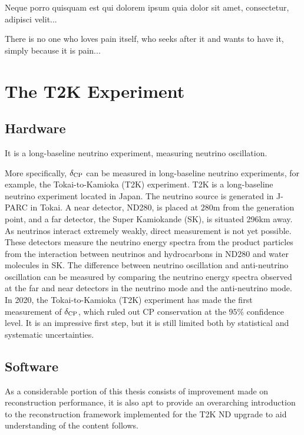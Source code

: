 \begin{savequote}[8cm]
\textlatin{Neque porro quisquam est qui dolorem ipsum quia dolor sit amet, consectetur, adipisci velit...}

There is no one who loves pain itself, who seeks after it and wants to have it, simply because it is pain...
\end{savequote}

\chapter{\label{ch:3-t2k}The T2K Experiment} 

\minitoc

\section{Hardware}

It is a long-baseline neutrino experiment, measuring neutrino oscillation.

More specifically, $\delta_\textrm{CP}$ can be measured in long-baseline neutrino experiments, for example, the Tokai-to-Kamioka (T2K) experiment\cite{T2KEXP}. 
T2K is a long-baseline neutrino experiment located in Japan. 
The neutrino source is generated in J-PARC in Tokai. 
A near detector, ND280, is placed at $280\mathrm{m}$ from the generation point, and a far detector, the Super Kamiokande (SK), is situated 296km away. As neutrinos interact extremely weakly, direct measurement is not yet possible. These detectors measure the neutrino energy spectra from the product particles from the interaction between neutrinos and hydrocarbons in ND280 and water molecules in SK. The difference between neutrino oscillation and anti-neutrino oscillation can be measured by comparing the neutrino energy spectra observed at the far and near detectors in the neutrino mode and the anti-neutrino mode. In 2020, the Tokai-to-Kamioka (T2K) experiment\cite{T2KEXP} has made the first measurement of $\delta_\textrm{CP}$\cite{T2Knature}, which ruled out CP conservation at the $95\%$ confidence level. It is an impressive first step, but it is still limited both by statistical and systematic uncertainties. 

 
\section{Software}
  \label{sec:t2k-sw}
  As a considerable portion of this thesis consists of improvement made on reconstruction performance, it is also apt to provide an overarching introduction to the reconstruction framework implemented for the T2K ND upgrade to aid understanding of the content follows.

